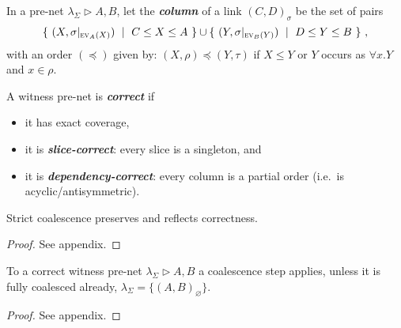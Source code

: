 \documentclass[UKenglish]{lipics-v2016}
\theoremstyle{plain}
\newcommand\defn[1]{\textit{\textbf{#1}}}
\newcommand\ex[2][{}]{\textsc{ev}_{#1}(#2)}
\newcommand\+{+}
\renewcommand\*{\times}
\newcommand\sub{\leq}
\newcommand\dep{\preccurlyeq}
\newcommand\net[3]{#1\triangleright #2,#3}
\newcommand\res[1]{|_{#1}}
\newcommand\link[3][\sigma]{(#2,#3)_{#1}}
\begin{document}
In a pre-net $\net{\lambda_\Sigma}AB$, let the \defn{column} of a link $\link CD$ be the set of pairs 
\[
	\{~(X,\sigma\res{\ex[A]X})~\mid~C\sub X\sub A~\}\cup\{~(Y,\sigma\res{\ex[B]Y})~\mid~D\sub Y\sub B~\}~,
\]
with an order $(\dep)$ given by: $(X,\rho)\dep(Y,\tau)$ if $X\leq Y$ or $Y$ occurs as $\forall x.Y$ and $x\in\rho$.

%


\begin{definition}
A witness pre-net is \defn{correct} if
\begin{itemize}
\item it has exact coverage,
\item it is \defn{slice-correct}: every slice is a singleton, and
\item it is \defn{dependency-correct}: every column is a partial order (i.e.\ is acyclic/antisymmetric).
\end{itemize}
\end{definition}


\setcounter{lemcorrect}{\thetheorem}
\begin{lemma}
\label{lem:correct}
Strict coalescence preserves and reflects correctness.
\end{lemma}

\begin{proof}
See appendix.
\end{proof}


\setcounter{lemcoalescenceapplies}{\thetheorem}
\begin{lemma}
\label{lem:coalescence applies}
To a correct witness pre-net $\net{\lambda_\Sigma}AB$ a coalescence step applies, unless it is fully coalesced already, $\lambda_\Sigma=\{\link[\varnothing]AB\}$.
\end{lemma}

\begin{proof}
See appendix.
\end{proof}

\end{document}
